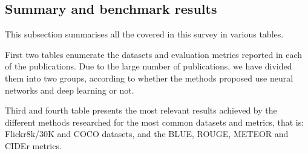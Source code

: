 \subsection{Summary and benchmark results}

This subsection summarises all the covered in this survey in various tables. 

First two tables enumerate the datasets and evaluation metrics reported in each of the publications. Due to the large number of publications, we have divided them into two groups, according to whether the methods proposed use neural networks and deep learning or not.

Third and fourth table presents the most relevant results achieved by the different methods researched for the most common datasets and metrics, that is: Flickr8k/30K and COCO datasets, and the BLUE, ROUGE, METEOR and CIDEr metrics.

